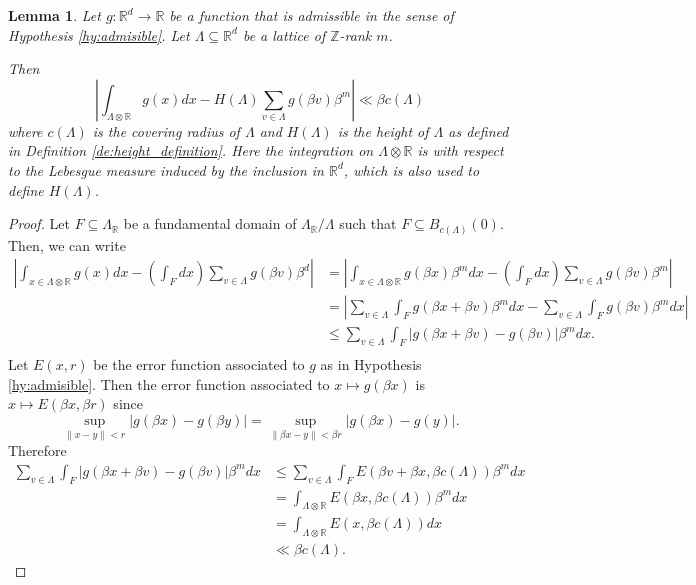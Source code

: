 \documentclass{amsart}
\newtheorem{lemma}[theorem]{Lemma}
\begin{document}
\begin{lemma}
\label{le:covering_radius}
Let $g:\mathbb{R}^{d} \rightarrow \mathbb{R}$ be a function that is admissible in the sense of Hypothesis \ref{hy:admisible}. Let $\Lambda \subseteq \mathbb{R}^{d}$ be a lattice of $\mathbb{Z}$-rank $m$. 

Then
  \begin{equation}
	  \left|  \int_{\Lambda\otimes \mathbb{R}} g(x)dx  - H(\Lambda)\sum_{v \in \Lambda}g(\beta v) \beta^{m} \right| \ll \beta c(\Lambda)
  \end{equation}
  where $c(\Lambda)$ is the covering radius of $\Lambda$ and $H(\Lambda)$ is the height of $\Lambda$ as defined in Definition \ref{de:height_definition}.  Here the integration on $\Lambda \otimes \mathbb{R}$ 
  is with respect to the Lebesgue measure induced by the inclusion in $\mathbb{R}^{d}$, which is also used to define $H(\Lambda)$.
\end{lemma}
\begin{proof}
	Let $F \subseteq \Lambda_\mathbb{R}$ be a fundamental domain 
	of $\Lambda_\mathbb{R}/ \Lambda$ such that $F \subseteq B_{c(\Lambda)}(0)$. Then, we can write 
  {\small\begin{align}
	  \left|  \int_{x \in \Lambda\otimes \mathbb{R}} g(x)dx  - \left(\int_{F} dx\right) \sum_{v \in \Lambda}g(\beta v) \beta^{d} \right|
	  & = 
	  \left|  \int_{x \in \Lambda\otimes \mathbb{R}} g( \beta x) \beta ^{m } dx  - \left(\int_{F} dx \right) \sum_{v \in \Lambda}g(\beta v) \beta^{m} \right| \\
	  & = 
	  \left|  \sum_{v \in \Lambda } \int_{F} g( \beta x+ \beta v) \beta^{m} dx  - \sum_{v \in \Lambda} \int_{F} g(\beta v)  \beta^{m} dx \right| \\
	  & \leq
	    \sum_{v \in \Lambda } \int_{F} \left|g( \beta x+ \beta v)   -g(\beta v) \right| \beta^{m} dx. \\
  \end{align}}
  Let $E(x,r)$ be the error function associated to $g$ as in Hypothesis \ref{hy:admisible}. Then the error function associated to $x \mapsto g(\beta x)$ is $x \mapsto E( \beta x,{\beta} r)$ since 
  \begin{equation}
    \sup_{\|x-y\| < r} |g(\beta x) - g(\beta y)| 
    =
    \sup_{\| \beta x - y \| < \beta r  } |g(\beta x) - g(y)| .
  \end{equation}
  Therefore 
  \begin{align}
    \sum_{v \in \Lambda } \int_{F} \left|g( \beta x+ \beta v)   -g(\beta v) \right| \beta^{m} dx  
    & \leq \sum_{v \in \Lambda} \int_{F} E(\beta v + \beta x, \beta c(\Lambda)) \beta^{m}dx \\
    & = \int_{\Lambda\otimes {\mathbb{R}}} E(\beta x,\beta c(\Lambda))\beta^{m} dx  \\
    & = \int_{\Lambda\otimes {\mathbb{R}}} E( x,\beta c(\Lambda))dx \\
    & \ll \beta c(\Lambda).
  \end{align}
\end{proof}
\end{document}
